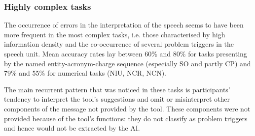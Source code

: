 \subsubsection{Highly complex tasks}


The occurrence of errors in the interpretation of the speech seems to have been more frequent in the most complex tasks, i.e. those characterised by high information density and the co-occurrence of several problem triggers in the speech unit. Mean accuracy rates lay between 60\% and 80\% for tasks presenting by the named entity-acronym-charge sequence (especially SO and partly CP) and 79\% and 55\% for numerical tasks (NIU, NCR, NCN).

The main recurrent pattern that was noticed in these tasks is participants’ tendency to interpret the tool’s suggestions and omit or misinterpret other components of the message not provided by the tool. These components were not provided because of the tool’s functions: they do not classify as problem triggers and hence would not be extracted by the AI.

